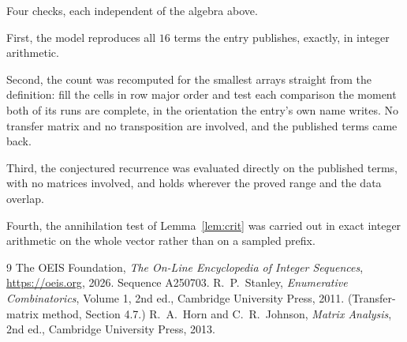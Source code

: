 \documentclass[11pt,a4paper]{article}
\theoremstyle{plain}
\theoremstyle{definition}
\begin{document}
Four checks, each independent of the algebra above.

First, the model reproduces all $16$ terms the entry publishes, exactly, in integer
arithmetic.

Second, the count was recomputed for the smallest arrays straight from the definition: fill the
cells in row major order and test each comparison the moment both of its runs are complete,
in the orientation the entry's own name writes. No transfer matrix and no transposition are
involved, and the published terms came back.

Third, the conjectured recurrence was evaluated directly on the published terms, with no
matrices involved, and holds wherever the proved range and the data overlap.

Fourth, the annihilation test of Lemma~\ref{lem:crit} was carried out in exact integer
arithmetic on the whole vector rather than on a sampled prefix.

\begin{thebibliography}{9}
 The OEIS Foundation, \emph{The On-Line Encyclopedia of Integer
Sequences}, \url{https://oeis.org}, 2026. Sequence A250703.
 R.~P.~Stanley, \emph{Enumerative Combinatorics}, Volume 1, 2nd ed.,
Cambridge University Press, 2011. (Transfer-matrix method, Section 4.7.)
 R.~A.~Horn and C.~R.~Johnson, \emph{Matrix Analysis}, 2nd ed., Cambridge
University Press, 2013.
\end{thebibliography}
\end{document}
